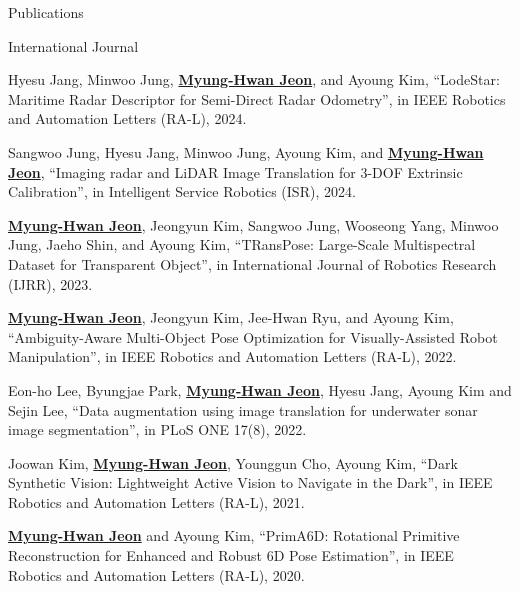 \begin{rSection}{Publications}



\begin{pubSubsection}{International Journal}

  \item Hyesu Jang, Minwoo Jung, \underline{\textbf{Myung-Hwan Jeon}}, and Ayoung Kim, “LodeStar: Maritime Radar Descriptor for Semi-Direct Radar Odometry”, in IEEE Robotics and Automation Letters (RA-L), 2024.
  
  \item Sangwoo Jung, Hyesu Jang, Minwoo Jung, Ayoung Kim, and \underline{\textbf{Myung-Hwan Jeon}}, “Imaging radar and LiDAR Image Translation for 3-DOF Extrinsic Calibration”, in Intelligent Service Robotics (ISR), 2024.

  \item \underline{\textbf{Myung-Hwan Jeon}}, Jeongyun Kim, Sangwoo Jung, Wooseong Yang, Minwoo Jung, Jaeho Shin, and Ayoung Kim, “TRansPose: Large-Scale Multispectral Dataset for Transparent Object”, in International Journal of Robotics Research (IJRR), 2023.

  \item \underline{\textbf{Myung-Hwan Jeon}}, Jeongyun Kim, Jee-Hwan Ryu, and Ayoung Kim, “Ambiguity-Aware Multi-Object Pose Optimization for Visually-Assisted Robot Manipulation”, in IEEE Robotics and Automation Letters (RA-L), 2022.
  
  \item Eon-ho Lee, Byungjae Park, \underline{\textbf{Myung-Hwan Jeon}}, Hyesu Jang, Ayoung Kim and Sejin Lee, “Data augmentation using image translation for underwater sonar image segmentation”, in PLoS ONE 17(8), 2022.
  
  \item Joowan Kim, \underline{\textbf{Myung-Hwan Jeon}}, Younggun Cho, Ayoung Kim, “Dark Synthetic Vision: Lightweight Active Vision to Navigate in the Dark”, in IEEE Robotics and Automation Letters (RA-L), 2021.
  
  \item \underline{\textbf{Myung-Hwan Jeon}} and Ayoung Kim, “PrimA6D: Rotational Primitive Reconstruction for Enhanced and Robust 6D Pose Estimation”, in IEEE Robotics and Automation Letters (RA-L), 2020.  

\end{pubSubsection}


\end{rSection}

